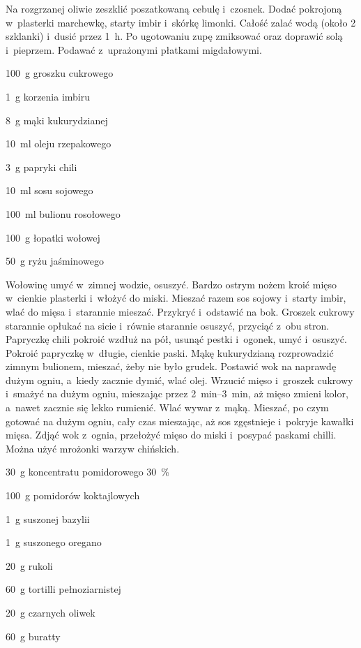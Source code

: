 \documentclass[../main.tex]{subfiles}
\begin{document}
Na rozgrzanej oliwie zeszklić poszatkowaną cebulę i~czosnek. Dodać pokrojoną
w~plasterki marchewkę, starty imbir i~skórkę limonki. Całość zalać wodą (około
\num{2} szklanki) i~dusić przez \qty{1}{\hour}. Po ugotowaniu zupę zmiksować
oraz doprawić solą i~pieprzem. Podawać z~uprażonymi płatkami migdałowymi.


\begin{Ingred}
    \item \qty{100}{\gram} groszku cukrowego
    \item \qty{1}{\gram} korzenia imbiru
    \item \qty{8}{\gram} mąki kukurydzianej
    \item \qty{10}{\milli\litre} oleju rzepakowego
    \item \qty{3}{\gram}  papryki chili
    \item \qty{10}{\milli\litre} sosu sojowego
    \item \qty{100}{\milli\litre} bulionu rosołowego
    \item \qty{100}{\gram} łopatki wołowej
    \item \qty{50}{\gram} ryżu jaśminowego
\end{Ingred}

Wołowinę umyć w~zimnej wodzie, osuszyć. Bardzo ostrym nożem kroić mięso
w~cienkie plasterki i~włożyć do miski. Mieszać razem sos sojowy i~starty imbir,
wlać do mięsa i~starannie mieszać. Przykryć i~odstawić na bok. Groszek cukrowy
starannie opłukać na sicie i~równie starannie osuszyć, przyciąć z~obu stron.
Papryczkę chili pokroić wzdłuż na pół, usunąć pestki i~ogonek, umyć i~osuszyć.
Pokroić papryczkę w~długie, cienkie paski. Mąkę kukurydzianą rozprowadzić
zimnym bulionem, mieszać, żeby nie było grudek. Postawić wok na naprawdę dużym
ogniu, a~kiedy zacznie dymić, wlać olej. Wrzucić mięso i~groszek cukrowy
i~smażyć na dużym ogniu, mieszając przez \qtyrange{2}{3}{\minute}, aż mięso
zmieni kolor, a~nawet zacznie się lekko rumienić. Wlać wywar z~mąką. Mieszać,
po czym gotować na dużym ogniu, cały czas mieszając, aż sos zgęstnieje
i~pokryje kawałki mięsa. Zdjąć wok z~ognia, przełożyć mięso do miski i~posypać
paskami chilli. Można użyć mrożonki warzyw chińskich.


\begin{Ingred}
    \item \qty{30}{\gram} koncentratu pomidorowego \qty{30}{\percent}
    \item \qty{100}{\gram} pomidorów koktajlowych
    \item \qty{1}{\gram} suszonej bazylii
    \item \qty{1}{\gram} suszonego oregano
    \item \qty{20}{\gram} rukoli
    \item \qty{60}{\gram} tortilli pełnoziarnistej
    \item \qty{20}{\gram} czarnych oliwek
    \item \qty{60}{\gram} buratty
\end{Ingred}
\end{document}
